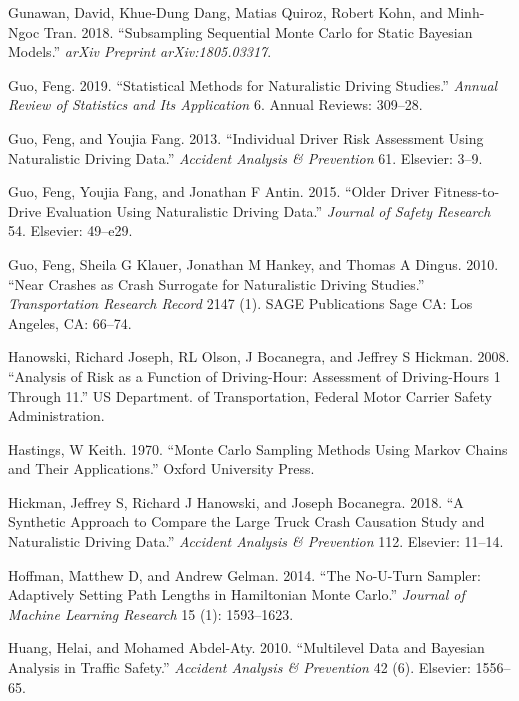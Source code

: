\documentclass[12pt]{book}
\numberwithin{equation}{chapter}
\begin{document}
\leavevmode\hypertarget{ref-gunawan2018subsampling}{}%
Gunawan, David, Khue-Dung Dang, Matias Quiroz, Robert Kohn, and Minh-Ngoc Tran. 2018. ``Subsampling Sequential Monte Carlo for Static Bayesian Models.'' \emph{arXiv Preprint arXiv:1805.03317}.

\leavevmode\hypertarget{ref-guo2019statistical}{}%
Guo, Feng. 2019. ``Statistical Methods for Naturalistic Driving Studies.'' \emph{Annual Review of Statistics and Its Application} 6. Annual Reviews: 309--28.

\leavevmode\hypertarget{ref-guo2013individual}{}%
Guo, Feng, and Youjia Fang. 2013. ``Individual Driver Risk Assessment Using Naturalistic Driving Data.'' \emph{Accident Analysis \& Prevention} 61. Elsevier: 3--9.

\leavevmode\hypertarget{ref-guo2015older}{}%
Guo, Feng, Youjia Fang, and Jonathan F Antin. 2015. ``Older Driver Fitness-to-Drive Evaluation Using Naturalistic Driving Data.'' \emph{Journal of Safety Research} 54. Elsevier: 49--e29.

\leavevmode\hypertarget{ref-guo2010near}{}%
Guo, Feng, Sheila G Klauer, Jonathan M Hankey, and Thomas A Dingus. 2010. ``Near Crashes as Crash Surrogate for Naturalistic Driving Studies.'' \emph{Transportation Research Record} 2147 (1). SAGE Publications Sage CA: Los Angeles, CA: 66--74.

\leavevmode\hypertarget{ref-hanowski2008analysis}{}%
Hanowski, Richard Joseph, RL Olson, J Bocanegra, and Jeffrey S Hickman. 2008. ``Analysis of Risk as a Function of Driving-Hour: Assessment of Driving-Hours 1 Through 11.'' US Department. of Transportation, Federal Motor Carrier Safety Administration.

\leavevmode\hypertarget{ref-hastings1970monte}{}%
Hastings, W Keith. 1970. ``Monte Carlo Sampling Methods Using Markov Chains and Their Applications.'' Oxford University Press.

\leavevmode\hypertarget{ref-hickman2018synthetic}{}%
Hickman, Jeffrey S, Richard J Hanowski, and Joseph Bocanegra. 2018. ``A Synthetic Approach to Compare the Large Truck Crash Causation Study and Naturalistic Driving Data.'' \emph{Accident Analysis \& Prevention} 112. Elsevier: 11--14.

\leavevmode\hypertarget{ref-hoffman2014no}{}%
Hoffman, Matthew D, and Andrew Gelman. 2014. ``The No-U-Turn Sampler: Adaptively Setting Path Lengths in Hamiltonian Monte Carlo.'' \emph{Journal of Machine Learning Research} 15 (1): 1593--1623.

\leavevmode\hypertarget{ref-huang2010multilevel}{}%
Huang, Helai, and Mohamed Abdel-Aty. 2010. ``Multilevel Data and Bayesian Analysis in Traffic Safety.'' \emph{Accident Analysis \& Prevention} 42 (6). Elsevier: 1556--65.
\end{document}

